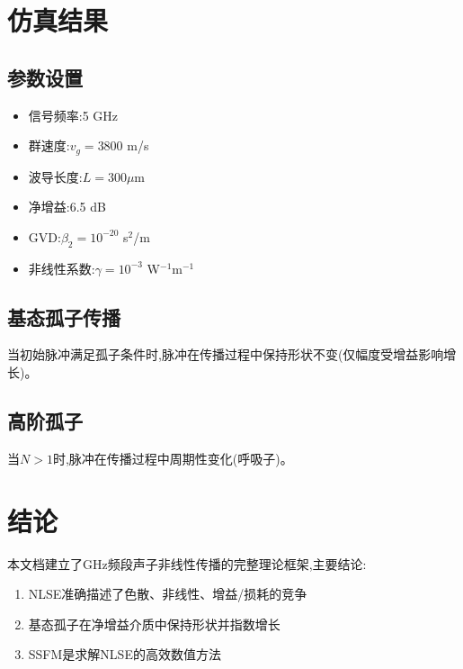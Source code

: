 \documentclass[12pt,a4paper]{article}
\theoremstyle{definition}
\begin{document}
\section{仿真结果}

\subsection{参数设置}

\begin{itemize}
    \item 信号频率:5 GHz
    \item 群速度:$v_g=3800$ m/s
    \item 波导长度:$L=300\mu$m
    \item 净增益:6.5 dB
    \item GVD:$\beta_2=10^{-20}$ s$^2$/m
    \item 非线性系数:$\gamma=10^{-3}$ W$^{-1}$m$^{-1}$
\end{itemize}

\subsection{基态孤子传播}

当初始脉冲满足孤子条件时,脉冲在传播过程中保持形状不变(仅幅度受增益影响增长)。

\subsection{高阶孤子}

当$N>1$时,脉冲在传播过程中周期性变化(呼吸子)。

\section{结论}

本文档建立了GHz频段声子非线性传播的完整理论框架,主要结论:
\begin{enumerate}
    \item NLSE准确描述了色散、非线性、增益/损耗的竞争
    \item 基态孤子在净增益介质中保持形状并指数增长
    \item SSFM是求解NLSE的高效数值方法
\end{enumerate}
\end{document}
